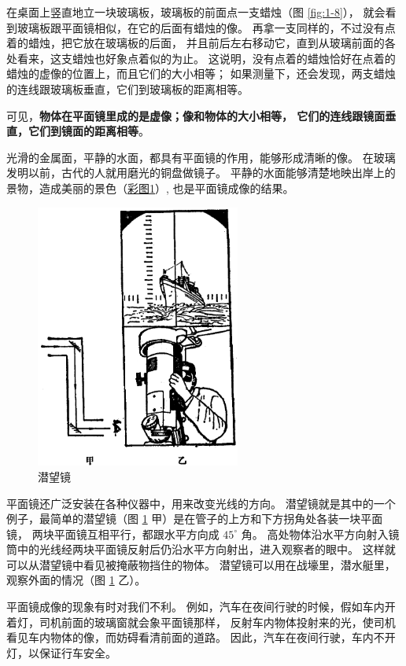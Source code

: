 在桌面上竖直地立一块玻璃板，玻璃板的前面点一支蜡烛（图 \ref{fig:1-8}），
就会看到玻璃板跟平面镜相似，在它的后面有蜡烛的像。
再拿一支同样的，不过没有点着的蜡烛，把它放在玻璃板的后面，
并且前后左右移动它，直到从玻璃前面的各处看来，这支蜡烛也好象点着似的为止。
这说明，没有点着的蜡烛恰好在点着的蜡烛的虚像的位置上，而且它们的大小相等；
如果测量下，还会发现，两支蜡烛的连线跟玻璃板垂直，它们到玻璃板的距离相等。

可见，\textbf{物体在平面镜里成的是虚像；像和物体的大小相等，
它们的连线跟镜面垂直，它们到镜面的距离相等}。

光滑的金属面，平静的水面，都具有平面镜的作用，能够形成清晰的像。
在玻璃发明以前，古代的人就用磨光的铜盘做镜子。
平静的水面能够清楚地映出岸上的景物，造成美丽的景色（\hyperref[fig:pic1]{彩图1}）, 也是平面镜成像的结果。

\begin{figure}[htbp]
    \centering
    \includegraphics[width=0.6\textwidth]{../pic/czwl2-ch1-9}
    \caption{潜望镜}\label{fig:1-9}
\end{figure}

平面镜还广泛安装在各种仪器中，用来改变光线的方向。
潜望镜就是其中的一个例子，最简单的潜望镜（图 \ref{fig:1-9} 甲）是在管子的上方和下方拐角处各装一块平面镜，
两块平面镜互相平行，都跟水平方向成 $45^\circ$ 角。
高处物体沿水平方向射入镜筒中的光线经两块平面镜反射后仍沿水平方向射出，进入观察者的眼中。
这样就可以从潜望镜中看见被掩蔽物挡住的物体。
潜望镜可以用在战壕里，潜水艇里，观察外面的情况（图 \ref{fig:1-9} 乙）。

平面镜成像的现象有时对我们不利。
例如，汽车在夜间行驶的时候，假如车内开着灯，司机前面的玻璃窗就会象平面镜那样，
反射车内物体投射来的光，使司机看见车内物体的像，而妨碍看清前面的道路。
因此，汽车在夜间行驶，车内不开灯，以保证行车安全。

